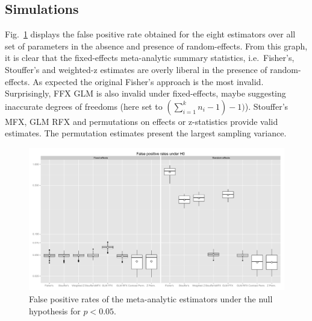 \documentclass{llncs}
\newcommand{\nStudies}{k}
\begin{document}
\subsection{Simulations}
Fig.~\ref{fig_fpr_all} displays the false positive rate obtained for the eight estimators over all set of parameters in the absence and presence of random-effects. From this graph, it is clear that the fixed-effects meta-analytic summary statistics, i.e.\ Fisher's, Stouffer's and weighted-z estimates are overly liberal in the presence of random-effects. As expected the original Fisher's approach is the most invalid. Surprisingly, FFX GLM is also invalid under fixed-effects, maybe suggesting inaccurate degrees of freedoms (here set to $(\sum_{i=1}^\nStudies n_i - 1) - 1)$). Stouffer's MFX, GLM RFX and permutations on effects or z-statistics provide valid estimates. The permutation estimates present the largest sampling variance.

\begin{figure}[ht]
	\centering
	\includegraphics[width=\linewidth]{./Rplot_FPR_all.pdf}
	\caption{False positive rates of the meta-analytic estimators under the null hypothesis for $p<0.05$.}
	\label{fig_fpr_all}
\end{figure}
\end{document}
